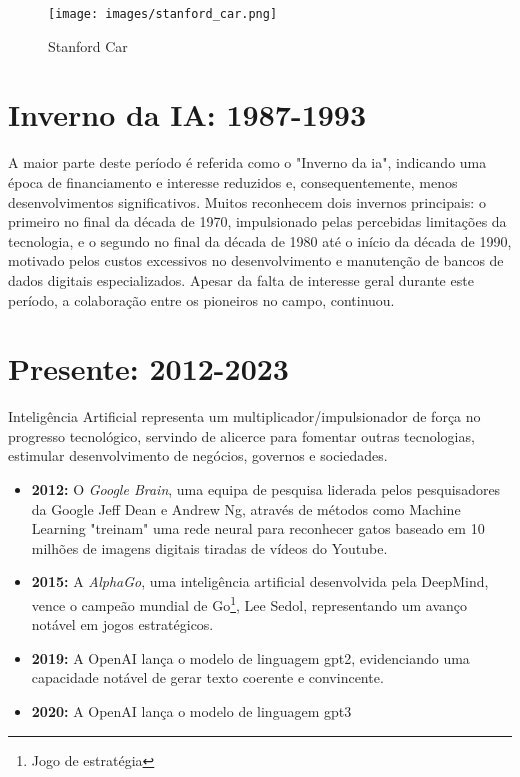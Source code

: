 \documentclass[a4paper, 11pt, onecolumn, oneside]{report}
\begin{document}
%
\begin{figure}[ht]
    \centering
    \texttt{[image: images/stanford\_car.png]}
    \caption{Stanford Car\cite{i21}}
    \label{stanford_car}
\end{figure}
%

\newpage %

\section{Inverno da IA: 1987-1993}
A maior parte deste período é referida como o "Inverno da \ac{ia}", indicando uma época de financiamento e interesse reduzidos e, consequentemente, menos desenvolvimentos significativos. Muitos reconhecem dois invernos principais: o primeiro no final da década de 1970, impulsionado pelas percebidas limitações da tecnologia, e o segundo no final da década de 1980 até o início da década de 1990, motivado pelos custos excessivos no desenvolvimento e manutenção de bancos de dados digitais especializados. Apesar da falta de interesse geral durante este período, a colaboração entre os pioneiros no campo, continuou.

\section{Presente: 2012-2023}
Inteligência Artificial representa um multiplicador/impulsionador de força no progresso tecnológico, servindo de alicerce para fomentar outras tecnologias, estimular desenvolvimento de negócios, governos e sociedades.
%
\begin{itemize}
    \item \textbf{2012:} O \textit{Google Brain}\cite{google_brain}, uma equipa de pesquisa liderada pelos pesquisadores da Google Jeff Dean e Andrew Ng, através de métodos como Machine Learning "treinam" uma rede neural para reconhecer gatos baseado em 10 milhões de imagens digitais tiradas de vídeos do Youtube. 
    \item \textbf{2015:} A \textit{AlphaGo}\cite{alphago}, uma inteligência artificial desenvolvida pela DeepMind, vence o campeão mundial de Go\footnote{Jogo de estratégia}, Lee Sedol, representando um avanço notável em jogos estratégicos.
    \item \textbf{2019:} A OpenAI lança o modelo de linguagem \ac{gpt2}, evidenciando uma capacidade notável de gerar texto coerente e convincente.
    \item \textbf{2020:} A OpenAI lança o modelo de linguagem \ac{gpt3}    
\end{itemize}
\end{document}
